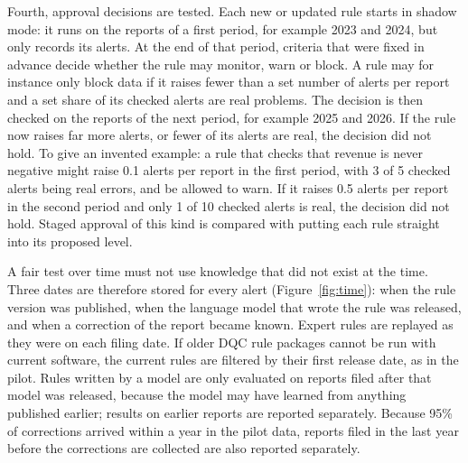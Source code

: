 \documentclass[11pt,a4paper]{article}
\begin{document}
Fourth, approval decisions are tested. Each new or updated rule starts in shadow mode: it runs on the reports of a first period, for example 2023 and 2024, but only records its alerts. At the end of that period, criteria that were fixed in advance decide whether the rule may monitor, warn or block. A rule may for instance only block data if it raises fewer than a set number of alerts per report and a set share of its checked alerts are real problems. The decision is then checked on the reports of the next period, for example 2025 and 2026. If the rule now raises far more alerts, or fewer of its alerts are real, the decision did not hold. To give an invented example: a rule that checks that revenue is never negative might raise 0.1 alerts per report in the first period, with 3 of 5 checked alerts being real errors, and be allowed to warn. If it raises 0.5 alerts per report in the second period and only 1 of 10 checked alerts is real, the decision did not hold. Staged approval of this kind is compared with putting each rule straight into its proposed level.

A fair test over time must not use knowledge that did not exist at the time. Three dates are therefore stored for every alert (Figure~\ref{fig:time}): when the rule version was published, when the language model that wrote the rule was released, and when a correction of the report became known. Expert rules are replayed as they were on each filing date. If older DQC rule packages cannot be run with current software, the current rules are filtered by their first release date, as in the pilot. Rules written by a model are only evaluated on reports filed after that model was released, because the model may have learned from anything published earlier; results on earlier reports are reported separately. Because 95\% of corrections arrived within a year in the pilot data, reports filed in the last year before the corrections are collected are also reported separately.
\end{document}
